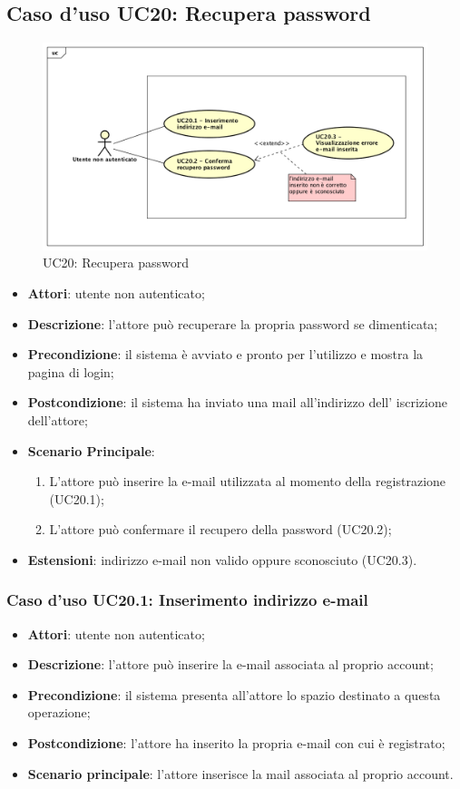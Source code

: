 \newpage
\subsection{Caso d'uso UC20: Recupera password}
\label{UC20}
\begin{figure}
	\centering
	\includegraphics[scale=0.48]{UML/UC20.png}
	\caption{UC20: Recupera password}
\end{figure}
\FloatBarrier
\begin{itemize}
	\item \textbf{Attori}: utente non autenticato;
	\item \textbf{Descrizione}: l'attore può recuperare la propria password se dimenticata;
	\item \textbf{Precondizione}: il sistema è avviato e pronto per l'utilizzo e mostra la pagina di login;
	\item \textbf{Postcondizione}: il sistema ha inviato una mail all'indirizzo dell' iscrizione dell'attore;
	\item \textbf{Scenario Principale}:
	\begin{enumerate}
		\item L'attore può inserire la e-mail utilizzata al momento della registrazione (UC20.1);
		\item L'attore può confermare il recupero della password (UC20.2);
	\end{enumerate}
	\item \textbf{Estensioni}: indirizzo e-mail non valido oppure sconosciuto (UC20.3).
\end{itemize}

\subsubsection{Caso d'uso UC20.1: Inserimento indirizzo e-mail}
\begin{itemize}
	\item \textbf{Attori}: utente non autenticato;
	\item \textbf{Descrizione}: l'attore può inserire la e-mail associata al proprio account;
	\item \textbf{Precondizione}: il sistema presenta all'attore lo spazio destinato a questa operazione;
	\item \textbf{Postcondizione}: l'attore ha inserito la propria e-mail con cui è registrato;
	\item \textbf{Scenario principale}: l'attore inserisce la mail associata al proprio account. 
\end{itemize}

